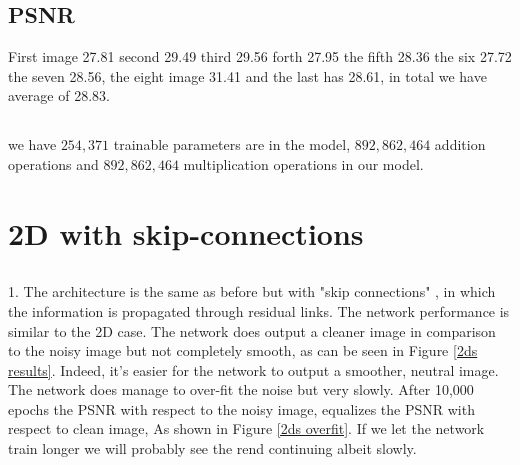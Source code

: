 \documentclass[12pt]{article}
\begin{document}
\subsection{PSNR}
First image 27.81 second 29.49 third 29.56 forth 27.95 the fifth 28.36 the six 27.72 the seven 28.56, the eight image 31.41 and the last has 28.61, in total we have average of 28.83.


\subsection{}
we have \(254,371\) trainable parameters are in the model, \(892,862,464\) addition operations and \(892,862,464\) multiplication operations in our model.

\section{2D with skip-connections}
\subsection{}
1. The architecture is the same as before but with "skip connections" , in which the information is propagated  through residual links. The network performance is similar to the 2D case.  The network does output a cleaner image in comparison to the noisy image but not completely smooth, as can be seen in Figure \ref{2ds results}. Indeed, it's easier for the network to output  a smoother, neutral image. The network does manage to over-fit the noise but very slowly. After 10,000 epochs the PSNR with respect to the noisy image, equalizes the PSNR with respect to clean image, As shown in Figure \ref{2ds overfit}. If we let the network train longer we will probably see the rend continuing albeit slowly.
\end{document}
